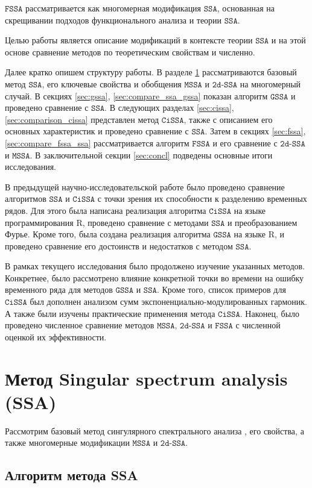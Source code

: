 \documentclass[12pt, specialist, subf
]{disser}
\theoremstyle{definition}
\newcommand{\SSA}{\texttt{SSA}}
\newcommand{\GSSA}{\texttt{GSSA}}
\newcommand{\CISSA}{\texttt{CiSSA}}
\newcommand{\MSSA}{\texttt{MSSA}}
\newcommand{\FSSA}{\texttt{FSSA}}
\newcommand{\DSSA}{\texttt{2d-SSA}}
\begin{document}
$\FSSA$ рассматривается как многомерная модификация $\SSA$, основанная на скрещивании подходов функционального анализа и теории $\SSA$.

Целью работы является описание модификаций в контексте теории $\SSA$ и на этой основе сравнение методов по теоретическим свойствам и численно.

Далее кратко опишем структуру работы. В разделе \ref{sec:ssa} рассматриваются базовый метод $\SSA$, его ключевые свойства и обобщения $\MSSA$ и $\DSSA$ на многомерный случай. В секциях \ref{sec:gssa}, \ref{sec:compare_ssa_gssa} показан алгоритм $\GSSA$ и проведено сравнение с $\SSA$. В следующих разделах \ref{sec:cissa}, \ref{sec:comparison_cissa} представлен метод $\CISSA$, также с описанием его основных характеристик и проведено сравнение с $\SSA$. Затем в секциях \ref{sec:fssa}, \ref{sec:compare_fssa_ssa} рассматривается алгоритм $\FSSA$ и его сравнение с $\DSSA$ и $\MSSA$.  В заключительной секции \ref{sec:concl} подведены основные итоги исследования.

В предыдущей научно-исследовательской работе было проведено сравнение алгоритмов $\SSA$ и $\CISSA$ с точки зрения их способности к разделению временных рядов. Для этого была написана реализация алгоритма $\CISSA$ на языке программирования R, проведено сравнение с методами $\SSA$ и преобразованием Фурье. Кроме того, была создана реализация алгоритма $\GSSA$ на языке R, и проведено сравнение его достоинств и недостатков с методом $\SSA$.

В рамках текущего исследования было продолжено изучение указанных методов. Конкретнее, было рассмотрено влияние конкретной точки во времени на ошибку временного ряда для методов $\GSSA$ и $\SSA$. Кроме того, список примеров для $\CISSA$ был дополнен анализом сумм экспоненциально-модулированных гармоник. А также были изучены практические применения метода $\CISSA$. Наконец, было проведено численное сравнение методов $\MSSA$, $\DSSA$ и $\FSSA$ с численной оценкой их эффективности.


\newpage

\chapter{Метод Singular spectrum analysis (SSA)}
\label{sec:ssa}


Рассмотрим базовый метод сингулярного спектрального анализа \cite{golyandina2001analysis}, его свойства, а также многомерные модификации $\MSSA$ и $\DSSA$.

\section{Алгоритм метода SSA}
\end{document}
